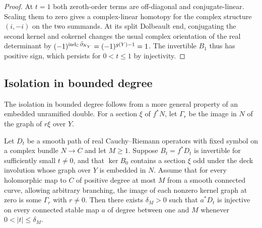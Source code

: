 \begin{proof}
At $t=1$ both zeroth-order terms are off-diagonal and conjugate-linear.
Scaling them to zero gives a complex-linear homotopy for the complex
structure $(i,-i)$ on the two summands. At its split Dolbeault end,
conjugating the second kernel and cokernel changes the usual complex
orientation of the real determinant by
$(-1)^{\operatorname{ind}_{\mathbb C}\bar\partial_{K_Y}}=(-1)^{g(Y)-1}=1$.
The invertible $B_1$ thus has positive sign, which persists for
$0<t\le1$ by injectivity.
\end{proof}

\subsection{Isolation in bounded degree}
The isolation in bounded degree follows from a more general property
of an embedded unramified double. For a section $\xi$ of $f^*N$, let
$\Gamma_r$ be the image in $N$ of the graph of $r\xi$ over $Y$.

\begin{proposition}\label{prop:interval}
Let $D_t$ be a smooth path of real Cauchy--Riemann operators with
fixed symbol on a complex bundle $N\to C$ and let $M\ge1$. Suppose
$B_t=f^*D_t$ is invertible for sufficiently small $t\ne0$, and that
$\ker B_0$ contains a section $\xi$ odd under the deck involution
whose graph over $Y$ is embedded in $N$. Assume that for every holomorphic map to $C$ of positive degree at
most $M$ from a smooth connected curve, allowing arbitrary branching,
the image of each
nonzero kernel graph at zero is some $\Gamma_r$ with $r\ne0$.
Then there exists $\delta_M>0$ such that $a^*D_t$ is injective on
every connected stable map $a$ of degree between one and $M$ whenever
$0<|t|\le\delta_M$.
\end{proposition}

